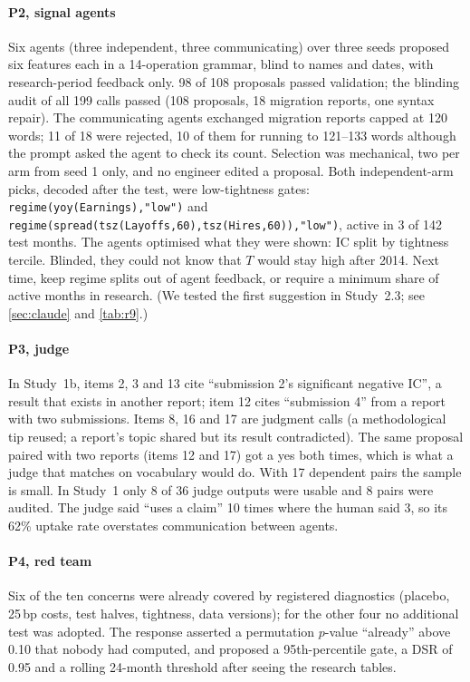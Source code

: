\paragraph{P2, signal agents} Six agents (three independent, three communicating) over three seeds proposed six features each in a 14-operation grammar, blind to names and dates, with research-period feedback only. 98 of 108 proposals passed validation; the blinding audit of all 199 calls passed (108 proposals, 18 migration reports, one syntax repair). %
The communicating agents exchanged migration reports capped at 120 words; 11 of 18 were rejected, 10 of them for running to 121--133 words although the prompt asked the agent to check its count. %
Selection was mechanical, two per arm from seed 1 only, and no engineer edited a proposal. Both independent-arm picks, decoded after the test, were low-tightness gates: \texttt{regime(yoy(Earnings),"low")} and \texttt{regime(spread(tsz(Layoffs,60),tsz(Hires,60)),"low")}, active in 3 of 142 test months. %
The agents optimised what they were shown: IC split by tightness tercile. Blinded, they could not know that $T$ would stay high after 2014. Next time, keep regime splits out of agent feedback, or require a minimum share of active months in research. (We tested the first suggestion in Study~2.3; see \cref{sec:claude} and \cref{tab:r9}.)

\paragraph{P3, judge} In Study~1b, items 2, 3 and 13 cite ``submission 2's significant negative IC'', a result that exists in another report; item 12 cites ``submission 4'' from a report with two submissions. Items 8, 16 and 17 are judgment calls (a methodological tip reused; a report's topic shared but its result contradicted). The same proposal paired with two reports (items 12 and 17) got a yes both times, which is what a judge that matches on vocabulary would do. With 17 dependent pairs the sample is small. In Study~1 only 8 of 36 judge outputs were usable and 8 pairs were audited. The judge said ``uses a claim'' 10 times where the human said 3, so its 62\% uptake rate overstates communication between agents. %

\paragraph{P4, red team} Six of the ten concerns were already covered by registered diagnostics (placebo, 25\,bp costs, test halves, tightness, data versions); for the other four no additional test was adopted. %
The response asserted a permutation $p$-value ``already'' above 0.10 that nobody had computed, and proposed a 95th-percentile gate, a DSR of 0.95 and a rolling 24-month threshold after seeing the research tables. %

